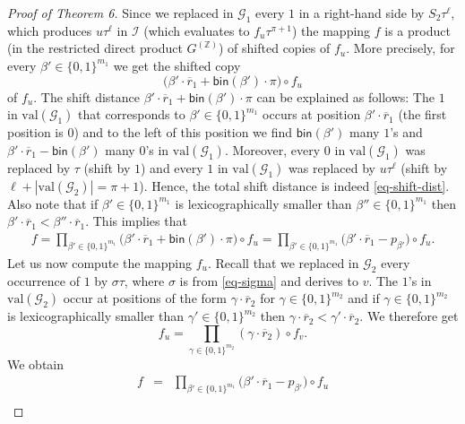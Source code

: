 \documentclass[10pt,a4paper]{article}
\newcommand{\val}{\mathrm{val}}
\begin{document}
\begin{proof}[Proof of Theorem 6]
Since we replaced in $\mathcal{G}_1$ every $1$ in a right-hand side by 
$S_2 \tau^\ell$, which produces $u \tau^\ell$ in $\mathcal{I}$ (which evaluates to $f_u \tau^{\pi+1}$)
the mapping $f$ is a product (in the restricted direct product $G^{(\mathbb{Z})}$) of shifted copies of $f_u$.
More precisely, for every $\beta' \in \{0,1\}^{m_1}$ we get the shifted copy 
\begin{equation} \label{eq-shift-dist}
 \big(\beta' \cdot \overline{r}_1 + \mathsf{bin}(\beta') \cdot \pi \big) \circ f_u 
\end{equation}
of $f_u$. The shift distance $\beta' \cdot \overline{r}_1 + \mathsf{bin}(\beta') \cdot \pi$ 
can be explained as follows: The $1$ in $\val(\mathcal{G}_1)$ that corresponds to $\beta' \in \{0,1\}^{m_1}$
occurs at position $\beta' \cdot \overline{r}_1$ (the first position is $0$) and to the left of this position we find $\mathsf{bin}(\beta')$ many
$1$'s and $\beta' \cdot \overline{r}_1 - \mathsf{bin}(\beta')$ many $0$'s in $\val(\mathcal{G}_1)$.
Moreover, every $0$ in $\val(\mathcal{G}_1)$ was replaced
by $\tau$ (shift by $1$) and every $1$ in $\val(\mathcal{G}_1)$ was replaced by $u \tau^\ell$ 
(shift by $\ell + |\val(\mathcal{G}_2)| = \pi + 1$). Hence, the total shift distance
is indeed  \eqref{eq-shift-dist}. Also note that
if $\beta' \in \{0,1\}^{m_1}$ is lexicographically smaller than $\beta'' \in \{0,1\}^{m_1}$ then 
$\beta' \cdot \overline{r}_1 < \beta'' \cdot \overline{r}_1$. 
This implies that 
\begin{eqnarray*}
f = \prod_{\beta' \in \{0,1\}^{m_1}}  \big(\beta' \cdot \overline{r}_1 + \mathsf{bin}(\beta') \cdot \pi \big) \circ f_u  = 
\prod_{\beta' \in \{0,1\}^{m_1}}  \big(\beta' \cdot \overline{r}_1 -p_{\beta'}  \big) \circ f_u .
\end{eqnarray*}
Let us now compute the mapping $f_u$. Recall that we replaced in $\mathcal{G}_2$ every occurrence of $1$ by  $\sigma \tau$, where $\sigma$ is from
\eqref{eq-sigma} and derives to $v$. The $1$'s in $\val(\mathcal{G}_2)$ occur at positions of the form $\gamma \cdot \overline{r}_2$
for $\gamma \in \{0,1\}^{m_2}$ and if $\gamma \in \{0,1\}^{m_2}$ is lexicographically smaller than $\gamma' \in \{0,1\}^{m_2}$ then 
$\gamma \cdot \overline{r}_2 < \gamma' \cdot \overline{r}_2$.
We therefore get
\[
f_u = \prod_{\gamma \in \{0,1\}^{m_2}}  (\gamma \cdot \overline{r}_2) \circ f_v . 
\]
We obtain 
\begin{eqnarray*}
f &=&  \prod_{\beta' \in \{0,1\}^{m_1}}  \big(\beta' \cdot \overline{r}_1 - p_{\beta'}\big) \circ f_u  \\

\end{eqnarray*}
\end{proof}
\end{document}
